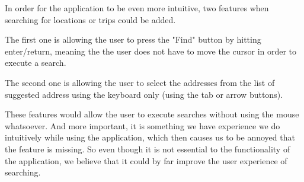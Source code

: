 In order for the application to be even more intuitive, two features when searching for locations or trips could be added.

The first one is allowing the user to press the "Find" button by hitting enter/return, meaning the the user does not have to move the cursor in order to execute a search.

The second one is allowing the user to select the addresses from the list of suggested address using the keyboard only (using the tab or arrow buttons).

These features would allow the user to execute searches without using the mouse whatsoever. And more important, it is something we have experience we do intuitively while using the application, which then causes us to be annoyed that the feature is missing. So even though it is not essential to the functionality of the application, we believe that it could by far improve the user experience of searching.
